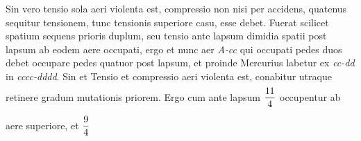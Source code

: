 
 \pstart  Sin vero tensio\protect{} sola aeri violenta est, compressio\protect{} non nisi per accidens, quatenus sequitur tensionem\protect{}, tunc tensionis\protect{}  superiore casu, esse debet. Fuerat scilicet spatium sequens prioris duplum, seu tensio\protect{} ante lapsum dimidia spatii post lapsum ab eodem aere occupati, ergo et nunc aer \textit{A-cc} qui occupati pedes duos  debet occupare pedes quatuor post lapsum, et proinde Mercurius\protect{} labetur ex \textit{cc-dd} in \textit{cccc-dddd}.
 \pend
 \pstart  Sin et Tensio\protect{} et compressio\protect{} aeri violenta est, conabitur utraque retinere gradum mutationis priorem. Ergo cum ante lapsum $\rule[-4mm]{0mm}{10mm}\displaystyle\frac{11}{4}$
%
                     occupentur ab aere superiore, et $\rule[-4mm]{0mm}{10mm}\displaystyle\frac{9}{4}$ %
